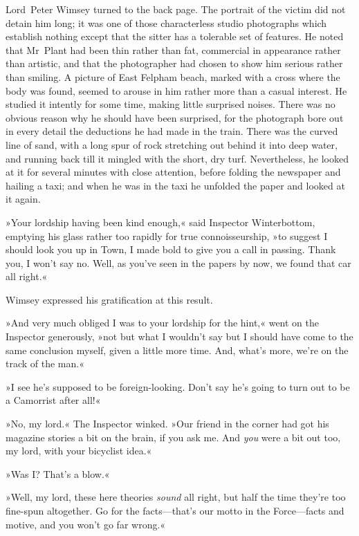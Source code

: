Lord~Peter Wimsey turned to the back page. The portrait of the victim did not detain him long; it was one of those characterless studio photographs which establish nothing except that the sitter has a tolerable set of features. He noted that Mr~Plant had been thin rather than fat, commercial in appearance rather than artistic, and that the photographer had chosen to show him serious rather than smiling. A picture of East Felpham beach, marked with a cross where the body was found, seemed to arouse in him rather more than a casual interest. He studied it intently for some time, making little surprised noises. There was no obvious reason why he should have been surprised, for the photograph bore out in every detail the deductions he had made in the train. There was the curved line of sand, with a long spur of rock stretching out behind it into deep water, and running back till it mingled with the short, dry turf. Nevertheless, he looked at it for several minutes with close attention, before folding the newspaper and hailing a taxi; and when he was in the taxi he unfolded the paper and looked at it again.

»Your lordship having been kind enough,« said Inspector Winterbottom, emptying his glass rather too rapidly for true connoisseurship, »to suggest I should look you up in Town, I made bold to give you a call in passing. Thank you, I won't say no. Well, as you've seen in the papers by now, we found that car all right.«

Wimsey expressed his gratification at this result.

»And very much obliged I was to your lordship for the hint,« went on the Inspector generously, »not but what I wouldn't say but I should have come to the same conclusion myself, given a little more time. And, what's more, we're on the track of the man.«

»I see he's supposed to be foreign-looking. Don't say he's going to turn out to be a Camorrist after all!«

»No, my lord.« The Inspector winked. »Our friend in the corner had got his magazine stories a bit on the brain, if you ask me. And \textit{you} were a bit out too, my lord, with your bicyclist idea.«

»Was I\@? That's a blow.«

»Well, my lord, these here theories \textit{sound} all right, but half the time they're too fine-spun altogether. Go for the facts—that's our motto in the Force—facts and motive, and you won't go far wrong.«

